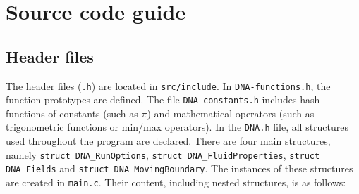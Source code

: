 \chapter{Source code guide}
\label{chap:Source code guide}

\section{Header files}
\label{sec:Header files}

The header files ({\tt *.h}) are located in {\tt src/include}. In {\tt DNA-functions.h}, the function prototypes are defined. The file {\tt DNA-constants.h} includes hash functions of constants (such as $\pi$) and mathematical operators (such as trigonometric functions or $\mathrm{min/max}$ operators). In the {\tt DNA.h} file, all structures used throughout the program are declared. There are four main structures, namely {\tt struct DNA\_RunOptions}, {\tt struct DNA\_FluidProperties}, {\tt struct DNA\_Fields} and {\tt struct DNA\_MovingBoundary}. The instances of these structures are created in {\tt main.c}. Their content, including nested structures, is as follows:

